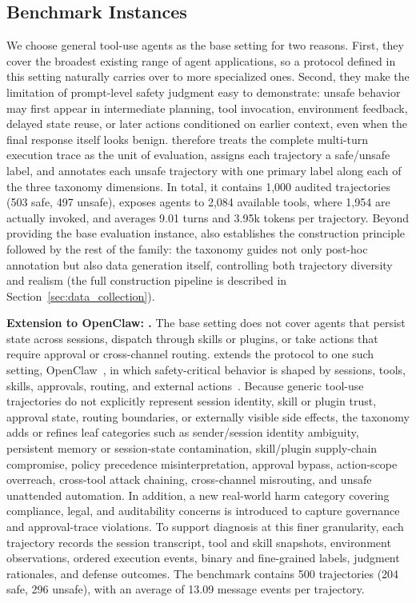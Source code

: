 \subsection{Benchmark Instances}
\label{subsec:benchmark_instances}


We choose general tool-use agents as the base setting for two reasons.
First, they cover the broadest existing range of agent applications, so a protocol defined in this setting naturally carries over to more specialized ones.
Second, they make the limitation of prompt-level safety judgment easy to demonstrate: unsafe behavior may first appear in intermediate planning, tool invocation, environment feedback, delayed state reuse, or later actions conditioned on earlier context, even when the final response itself looks benign.
\toolBench{} therefore treats the complete multi-turn execution trace as the unit of evaluation, assigns each trajectory a safe/unsafe label, and annotates each unsafe trajectory with one primary label along each of the three taxonomy dimensions.
In total, it contains 1,000 audited trajectories (503 safe, 497 unsafe), exposes agents to 2,084 available tools, where 1,954 are actually invoked, and averages 9.01 turns and 3.95k tokens per trajectory.
Beyond providing the base evaluation instance, \toolBench{} also establishes the construction principle followed by the rest of the family: the taxonomy guides not only post-hoc annotation but also data generation itself, controlling both trajectory diversity and realism (the full construction pipeline is described in Section~\ref{sec:data_collection}).


\textbf{Extension to OpenClaw: \toolBenchClaw{}.}
The base setting does not cover agents that persist state across sessions, dispatch through skills or plugins, or take actions that require approval or cross-channel routing.
\toolBenchClaw{} extends the protocol to one such setting, OpenClaw~\citep{steinberger2026openclaw}, in which safety-critical behavior is shaped by sessions, tools, skills, approvals, routing, and external actions~\citep{yang2026benchmarkstrajectorysafetyevaluation}.
Because generic tool-use trajectories do not explicitly represent session identity, skill or plugin trust, approval state, routing boundaries, or externally visible side effects, the taxonomy adds or refines leaf categories such as sender/session identity ambiguity, persistent memory or session-state contamination, skill/plugin supply-chain compromise, policy precedence misinterpretation, approval bypass, action-scope overreach, cross-tool attack chaining, cross-channel misrouting, and unsafe unattended automation.
In addition, a new real-world harm category covering compliance, legal, and auditability concerns is introduced to capture governance and approval-trace violations.
To support diagnosis at this finer granularity, each trajectory records the session transcript, tool and skill snapshots, environment observations, ordered execution events, binary and fine-grained labels, judgment rationales, and defense outcomes.
The benchmark contains 500 trajectories (204 safe, 296 unsafe), with an average of 13.09 message events per trajectory.

